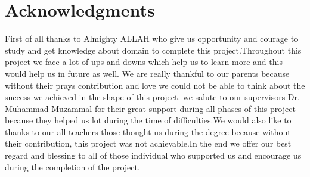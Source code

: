\chapter*{Acknowledgments}

First of all thanks to Almighty ALLAH who give us opportunity and courage to study and get knowledge about domain to complete this project.Throughout this project we face a lot of ups and downs which help us to learn more and this would help us in future as well. We are really thankful to our parents because without their prays contribution and love we could not be able to think about the success we achieved in the shape of this project. we salute to our supervisors Dr. Muhammad Muzammal for their great support during all phases of this project because they helped us lot during the time of difficulties.We would also like to thanks to our all teachers those thought us during the degree because without their contribution, this project was not achievable.In the end we offer our best regard and blessing to all of those individual who supported us and encourage us during the completion of the project.

\vspace{10mm}




